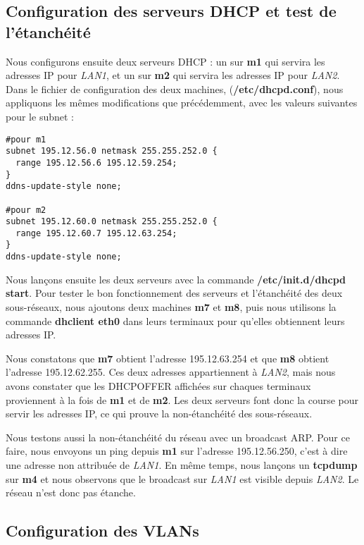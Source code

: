 \documentclass{article}
\begin{document}
\subsection{Configuration des serveurs DHCP et test de l'étanchéité}

Nous configurons ensuite deux serveurs DHCP : un sur \textbf{m1} qui servira les adresses IP pour \textit{LAN1}, et un sur \textbf{m2} qui servira les adresses IP pour \textit{LAN2}. \\

Dans le fichier de configuration des deux machines, (\textbf{/etc/dhcpd.conf}), nous appliquons les mêmes modifications que précédemment, avec les valeurs suivantes pour le subnet :
\begin{verbatim}
#pour m1
subnet 195.12.56.0 netmask 255.255.252.0 {
  range 195.12.56.6 195.12.59.254;
}
ddns-update-style none;

#pour m2
subnet 195.12.60.0 netmask 255.255.252.0 {
  range 195.12.60.7 195.12.63.254;
}
ddns-update-style none;
\end{verbatim} \newpage

Nous lançons ensuite les deux serveurs avec la commande \textbf{/etc/init.d/dhcpd start}. Pour tester le bon fonctionnement des serveurs et l'étanchéité des deux sous-réseaux, nous ajoutons deux machines \textbf{m7} et \textbf{m8}, puis nous utilisons la commande \textbf{dhclient eth0} dans leurs terminaux pour qu'elles obtiennent leurs adresses IP. 

Nous constatons que \textbf{m7} obtient l'adresse 195.12.63.254 et que \textbf{m8} obtient l'adresse 195.12.62.255. Ces deux adresses appartiennent à \textit{LAN2}, mais nous avons constater que les DHCPOFFER affichées sur chaques terminaux proviennent à la fois de \textbf{m1} et de \textbf{m2}. Les deux serveurs font donc la course pour servir les adresses IP, ce qui prouve la non-étanchéité des sous-réseaux.

Nous testons aussi la non-étanchéité du réseau avec un broadcast ARP. Pour ce faire, nous envoyons un ping depuis \textbf{m1} sur l'adresse 195.12.56.250, c'est à dire une adresse non attribuée de \textit{LAN1}. En même temps, nous lançons un \textbf{tcpdump} sur \textbf{m4} et nous observons que le broadcast sur \textit{LAN1} est visible depuis \textit{LAN2}. Le réseau n'est donc pas étanche.

\subsection{Configuration des VLANs}
\end{document}
